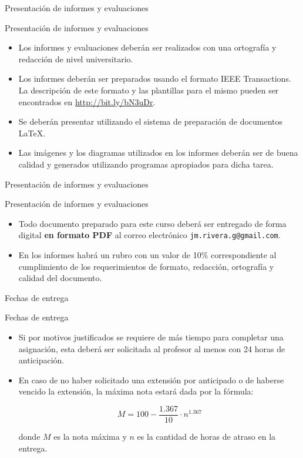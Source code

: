 \documentclass[xcolor=dvipsnames]{beamer}
\begin{document}
\begin{frame}{Presentación de informes y evaluaciones}
\begin{block}{Presentación de informes y evaluaciones}
  \begin{itemize}[<+->]
    \item Los informes y evaluaciones deberán ser realizados con una ortografía y redacción de nivel universitario.
    \item Los informes deberán ser preparados usando el formato IEEE Transactions. La descripción de este formato y las plantillas para el mismo pueden ser encontrados en \url{http://bit.ly/bN3uDr}. 
    \item Se deberán presentar utilizando el sistema de preparación de documentos \LaTeX. 
    \item Las imágenes y los diagramas utilizados en los informes deberán ser de buena calidad y generados utilizando programas apropiados para dicha tarea.
  \end{itemize}
\end{block}
\end{frame}


\begin{frame}{Presentación de informes y evaluaciones}
\begin{block}{Presentación de informes y evaluaciones}
  \begin{itemize}[<+->]
    \item Todo documento preparado para este curso deberá ser entregado de forma digital \textbf{en formato PDF} al correo electrónico \texttt{jm.rivera.g@gmail.com}.
    \item En los informes habrá un rubro con un valor de 10\% correspondiente al cumplimiento de los requerimientos de formato, redacción, ortografía y calidad del documento.
  \end{itemize}
\end{block}
\end{frame}

\begin{frame}{Fechas de entrega}

\begin{block}{Fechas de entrega}
  \begin{itemize}[<+->]
    \item Si por motivos justificados se requiere de más tiempo para completar una asignación, esta deberá ser solicitada al profesor al menos con 24 horas de anticipación.
    \item En caso de no haber solicitado una extensión por anticipado o de haberse vencido la extensión, la máxima nota estará dada por la fórmula:

      \[ M = 100-\frac{1.367}{10}\cdot n^{1.367} \]

    donde $M$ es la nota máxima y $n$ es la cantidad de horas de atraso en la entrega.
  \end{itemize}
\end{block}
\end{frame}
\end{document}
